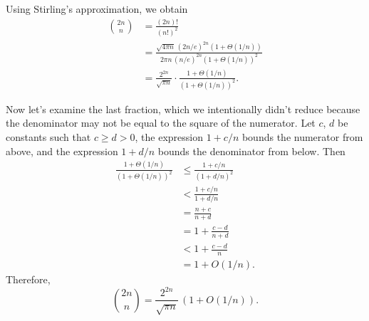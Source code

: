 Using Stirling's approximation, we obtain
\begin{align*}
    \binom{2n}{n} &= \frac{(2n)!}{(n!)^2} \\
    &= \frac{\sqrt{4\pi n}\,(2n/e)^{2n}(1+\Theta(1/n))}{2\pi n\,(n/e)^{2n}(1+\Theta(1/n))^2} \\[1mm]
    &= \frac{2^{2n}}{\sqrt{\pi n}}\cdot\frac{1+\Theta(1/n)}{(1+\Theta(1/n))^2}.
\end{align*}

Now let's examine the last fraction, which we intentionally didn't reduce because the denominator may not be equal to the square of the numerator.
Let $c$, $d$ be constants such that $c\ge d>0$, the expression $1+c/n$ bounds the numerator from above, and the expression $1+d/n$ bounds the denominator from below.
Then
\begin{align*}
    \frac{1+\Theta(1/n)}{(1+\Theta(1/n))^2} &\le \frac{1+c/n}{(1+d/n)^2} \\[1mm]
    &< \frac{1+c/n}{1+d/n} \\[1mm]
    &= \frac{n+c}{n+d} \\
    &= 1+\frac{c-d}{n+d} \\[1mm]
    &< 1+\frac{c-d}{n} \\[1mm]
    &= 1+O(1/n).
\end{align*}
Therefore,
\[
    \binom{2n}{n} = \frac{2^{2n}}{\sqrt{\pi n}}\,(1+O(1/n)).
\]
